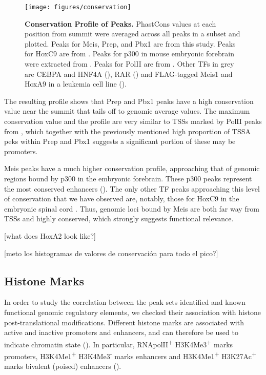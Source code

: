 \begin{figure}[]
  \centering
  \texttt{[image: figures/conservation]}
  \caption[Conservation Profile of Peaks]{\textbf{Conservation Profile of Peaks.} PhastCons values at each position from summit were averaged across all peaks in a subset and plotted. Peaks for Meis, Prep, and Pbx1 are from this study. Peaks for HoxC9 are from \cite{Jung2010}. Peaks for p300 in mouse embryonic forebrain were extracted from \cite{Blow2010}. Peaks for PolII are from \cite{Mahony2011}. Other TFs in grey are CEBPA and HNF4A (\cite{Schmidt2010}), RAR (\cite{Mahony2011}) and FLAG-tagged Meis1 and HoxA9 in a leukemia cell line (\cite{Huang2012}).}
  \label{fig:conservation}
\end{figure}

The resulting profile shows that Prep and Pbx1 peaks have a high conservation value near the summit that tails off to genomic average values. The maximum conservation value and the profile are very similar to \acp{TSS} marked by \ac{PolII} peaks from \cite{Mahony2011}, which together with the previously mentioned high proportion of \ac{TSSA} peks within Prep and Pbx1 suggests a significant portion of these may be promoters.

Meis peaks have a much higher conservation profile, approaching that of genomic regions bound by p300 in the embryonic forebrain. These p300 peaks represent the most conserved enhancers (\cite{Blow2010}). The only other \ac{TF} peaks approaching this level of conservation that we have observed are, notably, those for HoxC9 in the embryonic spinal cord \cite{Jung2010}. Thus, genomic loci bound by Meis are both far way from \acp{TSS} and highly conserved, which strongly suggests functional relevance.

[what does HoxA2 look like?] 

[meto los histogramas de valores de conservación para todo el pico?]

\subsection{Histone Marks}

In order to study the correlation between the peak sets identified and known functional genomic regulatory elements, we checked their association with histone post-translational modifications. Different histone marks are associated with active and inactive promoters and enhancers, and can therefore be used to indicate chromatin state (\cite{Mikkelsen2007}). In particular, RNApolII\textsuperscript{+} H3K4Me3\textsuperscript{+} marks promoters,  H3K4Me1\textsuperscript{+} H3K4Me3\textsuperscript{-} marks enhancers and H3K4Me1\textsuperscript{+} H3K27Ac\textsuperscript{+} marks bivalent (poised) enhancers (\cite{Creyghton2010}). 

